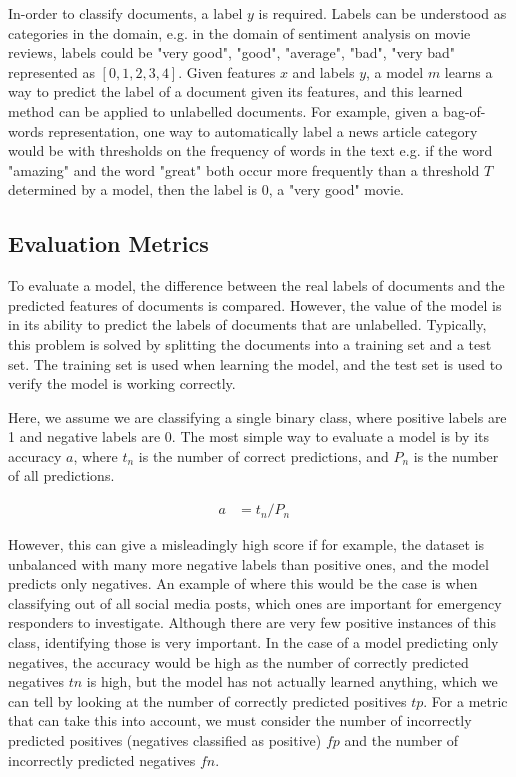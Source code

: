 In-order to classify documents, a label $y$ is required. Labels can be understood as categories in the domain, e.g. in the domain of sentiment analysis on movie reviews, labels could be "very good", "good", "average", "bad", "very bad" represented as $[0, 1, 2, 3, 4]$. Given features $x$ and labels $y$, a model $m$ learns a way to predict the label of a document given its features, and this learned method can be applied to unlabelled documents. For example, given a bag-of-words representation, one way to automatically label a news article category would be with thresholds on the frequency of words in the text e.g. if the word "amazing" and the word "great" both occur more frequently than a threshold $T$ determined by a model, then the label is $0$,  a "very good" movie. 

\subsection{Evaluation Metrics}

To evaluate a model, the difference between the real labels of documents and the predicted features of documents is compared. However, the value of the model is in its ability to predict the labels of documents that are unlabelled. Typically, this problem is solved by splitting the documents into a training set and a test set. The training set is used when learning the model, and the test set is used to verify the model is working correctly. 

Here, we assume we are classifying a single binary class, where positive labels are 1 and negative labels are 0. The most simple way to evaluate a model is by its accuracy $a$, where ${t_n}$ is the number of correct predictions, and $P_n$ is the number of all predictions.

\begin{align*}
a &= t_n / P_n  &
\end{align*}

However, this can give a misleadingly high score if for example, the dataset is unbalanced with many more negative labels than positive ones, and the model predicts only negatives. An example of where this would be the case is when classifying out of all social media posts, which ones are important for emergency responders to investigate. Although there are very few positive instances of this class, identifying those is very important. In the case of a model predicting only negatives, the accuracy would be high as the number of correctly predicted negatives ${tn}$ is high, but the model has not actually learned anything, which we can tell by looking at the number of correctly predicted positives ${tp}$. For a metric that can take this into account, we must consider the number of incorrectly predicted positives (negatives classified as positive) ${fp}$ and the number of incorrectly predicted negatives ${fn}$.

